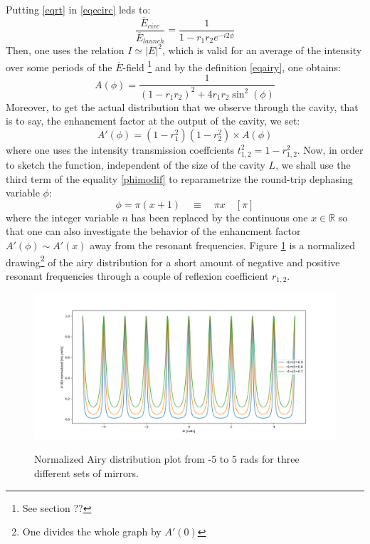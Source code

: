 \documentclass[12pt]{report}
\begin{document}
Putting \eqref{eqrt} in \eqref{eqecirc} leds to:
\begin{equation}
\frac{\overline{E}_{circ}}{\overline{E}_{launch}} = \frac{1}{1 - r_1 r_2 e^{-i2\phi}}
\end{equation}
Then, one uses the relation $ I \simeq \vert\overline{E}\vert^2$, which is valid for an average of the intensity over some periods of the $\overline{E}$-field \footnote{See section ??} and by the definition \eqref{eqairy}, one obtains:
\begin{equation}
\label{airyformula}
A(\phi) = \frac{1}{(1 - r_1 r_2)^2 + 4 r_1 r_2 \sin^2(\phi)}
\end{equation}
Moreover, to get the actual distribution that we observe through the cavity, that is to say, the enhancment factor at the output of the cavity, we set:
\begin{equation}
\label{airyformulasec}
A'(\phi) = (1-r_1^2)(1-r_2^2)\times A(\phi)
\end{equation}
where one uses the intensity transmission coeffcients $t_{1,2}^2 = 1-r_{1,2}^2$. Now, in order to sketch the function, independent of the size of the cavity $L$, we shall use the third term of the equality \eqref{phimodif} to reparametrize the round-trip dephasing variable $\phi$:
\begin{equation}
\label{phidef}
\phi = \pi(x+1) \quad \equiv \quad \pi x \quad [\pi]
\end{equation}
where the integer variable $n$ has been replaced by the continuous one $x \in \mathbb{R}$ so that one can also investigate the behavior of the enhancment factor $A'(\phi) \sim A'(x)$ away from the resonant frequencies. Figure \ref{fig:airy-dist} is a normalized drawing\footnote{One divides the whole graph by $A'(0)$} of the airy distribution for a short amount of negative and positive resonant frequencies through a couple of reflexion coefficient $r_{1,2}$. 

\begin{figure}[h]
\caption{Normalized Airy distribution plot from -5 to 5 rads for three different sets of mirrors.}
\centering
\includegraphics[width=\textwidth]{airy-dist}
\label{fig:airy-dist}
\end{figure}
\end{document}
